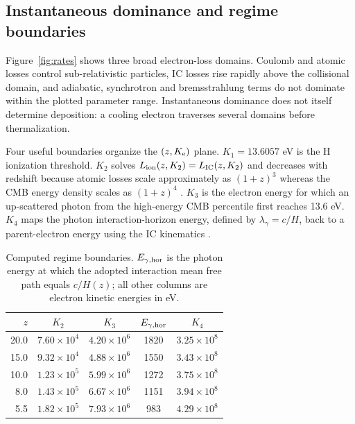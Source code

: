 \documentclass[10pt,twocolumn]{article}
\newcommand{\Ke}{K_{\rm e}}
\begin{document}
\subsection{Instantaneous dominance and regime boundaries}

Figure~\ref{fig:rates} shows three broad electron-loss domains. Coulomb and
atomic losses control sub-relativistic particles, IC losses rise rapidly above
the collisional domain, and adiabatic, synchrotron and bremsstrahlung terms do
not dominate within the plotted parameter range. Instantaneous dominance does
not itself determine deposition: a cooling electron traverses several domains
before thermalization.

Four useful boundaries organize the $(z,\Ke)$ plane. $K_1=13.6057$ eV is the H
ionization threshold. $K_2$ solves
$L_{\rm ion}(z,K_2)=L_{\rm IC}(z,K_2)$ and decreases with redshift because
atomic losses scale approximately as $(1+z)^3$ whereas the CMB energy density
scales as $(1+z)^4$ \citep{Kim2000,Blumenthal1970}. $K_3$ is the electron
energy for which an up-scattered photon from the high-energy CMB percentile
first reaches 13.6 eV. $K_4$ maps the photon interaction-horizon energy,
defined by $\lambda_\gamma=c/H$, back to a parent-electron energy using the IC
kinematics \citep{Blumenthal1970,Karzas1961}.

\begin{table}[t]
\centering
\caption{Computed regime boundaries. $E_{\gamma,\rm hor}$ is the photon
energy at which the adopted interaction mean free path equals $c/H(z)$; all
other columns are electron kinetic energies in eV.}
\label{tab:bounds}
\footnotesize
\begin{tabular}{rcccc}
\toprule
$z$ & $K_2$ & $K_3$ & $E_{\gamma,\rm hor}$ & $K_4$\\
\midrule
20.0 & $7.60\!\times\!10^4$ & $4.20\!\times\!10^6$ & 1820 & $3.25\!\times\!10^8$\\
15.0 & $9.32\!\times\!10^4$ & $4.88\!\times\!10^6$ & 1550 & $3.43\!\times\!10^8$\\
10.0 & $1.23\!\times\!10^5$ & $5.99\!\times\!10^6$ & 1272 & $3.75\!\times\!10^8$\\
 8.0 & $1.43\!\times\!10^5$ & $6.67\!\times\!10^6$ & 1151 & $3.94\!\times\!10^8$\\
 5.5 & $1.82\!\times\!10^5$ & $7.93\!\times\!10^6$ &  983 & $4.29\!\times\!10^8$\\
\bottomrule
\end{tabular}
\end{table}
\end{document}
